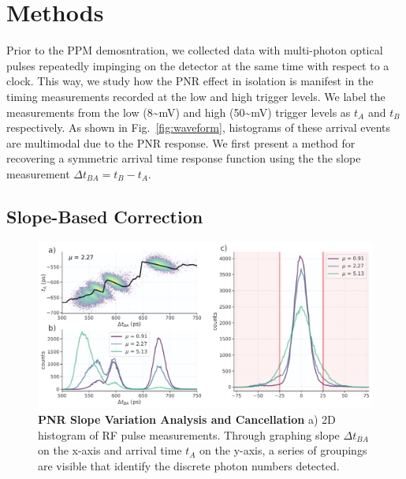\documentclass[11pt]{caltech_thesis} %
\begin{document}
\hypertarget{methods}{%
\section{Methods}\label{methods}}

Prior to the PPM demosntration, we collected data with multi-photon
optical pulses repeatedly impinging on the detector at the same time
with respect to a clock. This way, we study how the PNR effect in
isolation is manifest in the timing measurements recorded at the low and
high trigger levels. We label the measurements from the low
(8\textasciitilde mV) and high (50\textasciitilde mV) trigger levels as
$t_A$ and $t_B$ respectively. As shown in Fig.~\ref{fig:waveform},
histograms of these arrival events are multimodal due to the PNR
response. We first present a method for recovering a symmetric arrival
time response function using the the slope measurement
$\Delta t_{BA} = t_B - t_A$.

\hypertarget{slope-based-correction}{%
\subsection{Slope-Based Correction}\label{slope-based-correction}}

\hypertarget{fig:slope_correction}{%
\begin{figure}
\centering
\includegraphics[width=1\textwidth,height=\textheight]{chapter_03/figs_03/slope_cancellation_light.pdf}
\caption[{PNR Slope Variation Analysis and Cancellation}]{\textbf{PNR
Slope Variation Analysis and Cancellation} a) 2D histogram of RF pulse
measurements. Through graphing slope $\Delta t_{BA}$ on the x-axis and
arrival time $t_A$ on the y-axis, a series of groupings are visible that
identify the discrete photon numbers detected.}
\label{fig:slope_correction}
\end{figure}
}
\end{document}
